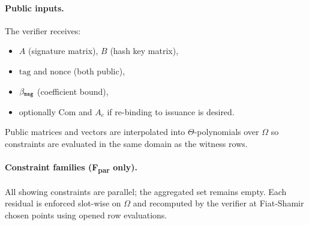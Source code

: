 \paragraph{Public inputs.}
The verifier receives:
\begin{itemize}
  \item $A$ (signature matrix), $B$ (hash key matrix),
  \item $\mathrm{tag}$ and $\mathrm{nonce}$ (both public),
  \item $\beta_{\mathtt{msg}}$ (coefficient bound),
  \item optionally $\mathrm{Com}$ and $A_c$ if re-binding to issuance is desired.
\end{itemize}
Public matrices and vectors are interpolated into $\Theta$-polynomials over $\Omega$ so constraints are evaluated in the
same domain as the witness rows.

\paragraph{Constraint families (F\textsubscript{par} only).}
All showing constraints are parallel; the aggregated set remains empty. Each residual is enforced slot-wise on $\Omega$
and recomputed by the verifier at Fiat-Shamir chosen points using opened row evaluations.

